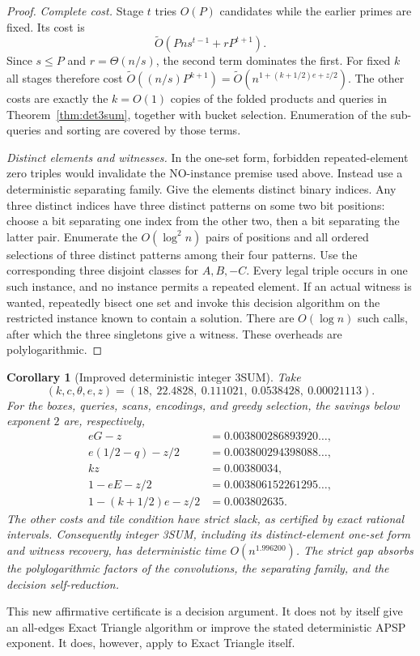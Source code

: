 \documentclass[11pt]{article}
\newtheorem{corollary}[theorem]{Corollary}
\newcommand{\softO}{\widetilde O}
\begin{document}
\begin{proof}
\emph{Complete cost.} Stage $t$ tries $O(P)$ candidates while the earlier
primes are fixed. Its cost is
\[
\softO\left(Pn s^{t-1}+rP^{t+1}\right).
\]
Since $s\le P$ and $r=\Theta(n/s)$, the second term dominates the first.
For fixed $k$ all stages therefore cost
$\softO((n/s)P^{k+1})=
\softO(n^{1+(k+1/2)e+z/2})$.
The other costs are exactly the $k=O(1)$ copies of the folded products
and queries in Theorem~\ref{thm:det3sum}, together with bucket selection.
Enumeration of the sub-queries and sorting are covered by those terms.

\emph{Distinct elements and witnesses.} In the one-set form, forbidden
repeated-element zero triples would invalidate the NO-instance premise
used above. Instead use a deterministic separating family. Give the
elements distinct binary indices. Any three distinct indices have three
distinct patterns on some two bit positions: choose a bit separating one
index from the other two, then a bit separating the latter pair.
Enumerate the $O(\log^2n)$ pairs of positions and all ordered selections
of three distinct patterns among their four patterns. Use the corresponding
three disjoint classes for $A,B,-C$. Every legal triple occurs in one such
instance, and no instance permits a repeated element. If an actual
witness is wanted, repeatedly bisect one set and invoke this decision
algorithm on the restricted instance known to contain a solution. There
are $O(\log n)$ such calls, after which the three singletons give a witness.
These overheads are polylogarithmic.
\end{proof}

\begin{corollary}[Improved deterministic integer 3SUM]
Take
\[
(k,c,\theta,e,z)=(18,\ 22.4828,\ 0.111021,\ 0.0538428,\ 0.00021113).
\]
For the boxes, queries, scans, encodings, and greedy selection, the savings
below exponent $2$ are, respectively,
\[
\begin{split}
eG-z&=0.003800286893920\ldots,\\
e(1/2-q)-z/2&=0.003800294398088\ldots,\\
kz&=0.00380034,\\
1-eE-z/2&=0.003806152261295\ldots,\\
1-(k+1/2)e-z/2&=0.003802635.
\end{split}
\]
The other costs and tile condition have strict slack, as certified by
exact rational intervals. Consequently integer 3SUM, including its
distinct-element one-set form and witness recovery, has deterministic time
$O(n^{1.996200})$. The strict gap absorbs the polylogarithmic factors of
the convolutions, the separating family, and the decision self-reduction.
\end{corollary}
This new affirmative certificate is a decision argument. It does not by
itself give an all-edges Exact Triangle algorithm or improve the stated
deterministic APSP exponent. It does, however, apply to Exact Triangle
itself.
\end{document}
